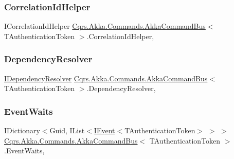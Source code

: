 \subsubsection{\texorpdfstring{Correlation\+Id\+Helper}{CorrelationIdHelper}}
{\footnotesize\ttfamily I\+Correlation\+Id\+Helper \hyperlink{classCqrs_1_1Akka_1_1Commands_1_1AkkaCommandBus}{Cqrs.\+Akka.\+Commands.\+Akka\+Command\+Bus}$<$ T\+Authentication\+Token $>$.Correlation\+Id\+Helper\hspace{0.3cm}{\ttfamily [get]}, {\ttfamily [protected]}}

\mbox{\label{classCqrs_1_1Akka_1_1Commands_1_1AkkaCommandBus_ae1229644077b0740d9014708d15b44c2_ae1229644077b0740d9014708d15b44c2}} 
\subsubsection{\texorpdfstring{Dependency\+Resolver}{DependencyResolver}}
{\footnotesize\ttfamily \hyperlink{interfaceCqrs_1_1Configuration_1_1IDependencyResolver}{I\+Dependency\+Resolver} \hyperlink{classCqrs_1_1Akka_1_1Commands_1_1AkkaCommandBus}{Cqrs.\+Akka.\+Commands.\+Akka\+Command\+Bus}$<$ T\+Authentication\+Token $>$.Dependency\+Resolver\hspace{0.3cm}{\ttfamily [get]}, {\ttfamily [protected]}}

\mbox{\label{classCqrs_1_1Akka_1_1Commands_1_1AkkaCommandBus_af64744500f25a0b203684ef757aa7962_af64744500f25a0b203684ef757aa7962}} 
\subsubsection{\texorpdfstring{Event\+Waits}{EventWaits}}
{\footnotesize\ttfamily I\+Dictionary$<$Guid, I\+List$<$\hyperlink{interfaceCqrs_1_1Events_1_1IEvent}{I\+Event}$<$T\+Authentication\+Token$>$ $>$ $>$ \hyperlink{classCqrs_1_1Akka_1_1Commands_1_1AkkaCommandBus}{Cqrs.\+Akka.\+Commands.\+Akka\+Command\+Bus}$<$ T\+Authentication\+Token $>$.Event\+Waits\hspace{0.3cm}{\ttfamily [get]}, {\ttfamily [protected]}}

